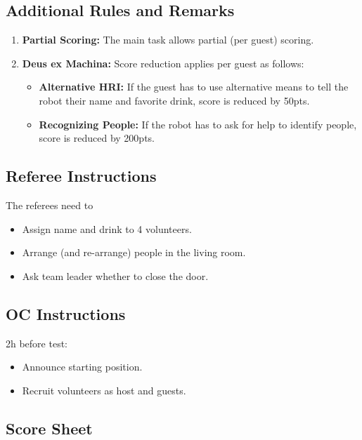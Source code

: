 \subsection*{Additional Rules and Remarks}
\begin{enumerate}[nosep]
	\item \textbf{Partial Scoring:} The main task allows partial (per guest) scoring.
	
	\item \textbf{Deus ex Machina:} Score reduction applies per guest as follows:
	\begin{itemize}[nosep]
		\item \textbf{Alternative HRI:} If the guest has to use alternative means to tell the robot their name and favorite drink, score is reduced by 50pts.
		\item \textbf{Recognizing People:} If the robot has to ask for help to identify people, score is reduced by 200pts. 
	\end{itemize}
\end{enumerate}


\subsection*{Referee Instructions}

The referees need to
\begin{itemize}
	\item Assign name and drink to 4 volunteers.
	\item Arrange (and re-arrange) people in the living room.
	\item Ask team leader whether to close the door.
\end{itemize}

\subsection*{OC Instructions}

2h before test:
\begin{itemize}
	\item Announce starting position.
	\item Recruit volunteers as host and guests.
\end{itemize}

\subsection*{Score Sheet}

